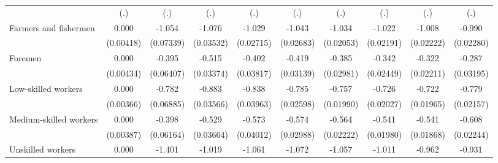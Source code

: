 {\begin{tabular}{l*{9}{c}}
                    &         (.)         &         (.)         &         (.)         &         (.)         &         (.)         &         (.)         &         (.)         &         (.)         &         (.)         \\
Farmers and fishermen&       0.000         &      -1.054\sym{***}&      -1.076\sym{***}&      -1.029\sym{***}&      -1.043\sym{***}&      -1.034\sym{***}&      -1.022\sym{***}&      -1.008\sym{***}&      -0.990\sym{***}\\
                    &   (0.00418)         &   (0.07339)         &   (0.03532)         &   (0.02715)         &   (0.02683)         &   (0.02053)         &   (0.02191)         &   (0.02222)         &   (0.02280)         \\
Foremen             &       0.000         &      -0.395\sym{***}&      -0.515\sym{***}&      -0.402\sym{***}&      -0.419\sym{***}&      -0.385\sym{***}&      -0.342\sym{***}&      -0.322\sym{***}&      -0.287\sym{***}\\
                    &   (0.00434)         &   (0.06407)         &   (0.03374)         &   (0.03817)         &   (0.03139)         &   (0.02981)         &   (0.02449)         &   (0.02211)         &   (0.03195)         \\
Low-skilled workers &       0.000         &      -0.782\sym{***}&      -0.883\sym{***}&      -0.838\sym{***}&      -0.785\sym{***}&      -0.757\sym{***}&      -0.726\sym{***}&      -0.722\sym{***}&      -0.779\sym{***}\\
                    &   (0.00366)         &   (0.06885)         &   (0.03566)         &   (0.03963)         &   (0.02598)         &   (0.01990)         &   (0.02027)         &   (0.01965)         &   (0.02157)         \\
Medium-skilled workers&       0.000         &      -0.398\sym{***}&      -0.529\sym{***}&      -0.573\sym{***}&      -0.574\sym{***}&      -0.564\sym{***}&      -0.541\sym{***}&      -0.541\sym{***}&      -0.608\sym{***}\\
                    &   (0.00387)         &   (0.06164)         &   (0.03664)         &   (0.04012)         &   (0.02988)         &   (0.02222)         &   (0.01980)         &   (0.01868)         &   (0.02244)         \\
Unskilled workers   &       0.000         &      -1.401\sym{***}&      -1.019\sym{***}&      -1.061\sym{***}&      -1.072\sym{***}&      -1.057\sym{***}&      -1.011\sym{***}&      -0.962\sym{***}&      -0.931\sym{***}\\

\end{tabular}}
